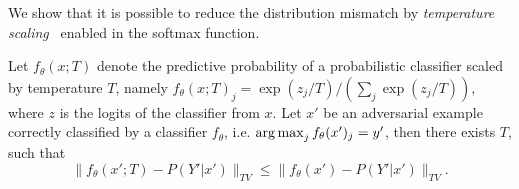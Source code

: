 We show that it is possible to reduce the distribution mismatch by \emph{temperature scaling}~\citep{Hinton2015DistillingTK, Guo2017OnCO} enabled in the softmax function.
\begin{theorem}
\label{theorem: model-probability}
    Let $f_\theta(x; T)$ denote the predictive probability of a probabilistic classifier scaled by temperature $T$, namely $f_\theta(x; T)_j = \exp(z_j/T) / (\sum_j \exp(z_j / T)), $
    where $z$ is the logits of the classifier from $x$. 
    Let $x'$ be an adversarial example correctly classified by a classifier $f_\theta$, i.e. $\operatorname*{arg\,max}_j f_\theta(x')_j = y'$,
    then there exists $T$, such that
    $$
    \| f_\theta(x'; T) - P(Y'|x') \|_{TV} \le \| f_\theta(x') - P(Y' | x')\|_{TV}.
    $$

\end{theorem}

